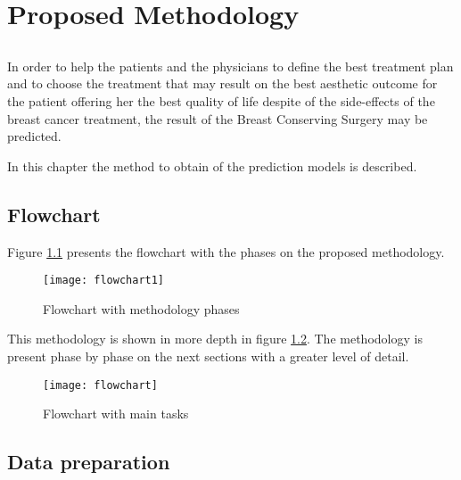 \chapter{Proposed Methodology}\label{chap:method}

\section*{}

In order to help the patients and the physicians to define the best treatment plan and to choose the treatment that may result on the best aesthetic outcome for the patient offering her the best quality of life despite of the side-effects of the breast cancer treatment, the result of the Breast Conserving Surgery may be predicted.

In this chapter the method to obtain of the prediction models is described.

\section{Flowchart}

Figure \ref{fig:flowchart1} presents the flowchart with the phases on the proposed methodology.


\begin{figure}[H]
  \begin{center}
    \leavevmode
    \texttt{[image: flowchart1]}
    \caption{Flowchart with methodology phases}
    \label{fig:flowchart1}
  \end{center}
\end{figure}

This methodology is shown in more depth in figure \ref{fig:flowchart2}. The methodology is present phase by phase on the next sections with a greater level of detail.

\begin{figure}[H]
  \begin{center}
    \leavevmode
    \texttt{[image: flowchart]}
    \caption{Flowchart with main tasks}
    \label{fig:flowchart2}
  \end{center}
\end{figure}

\clearpage

\section{Data preparation}

